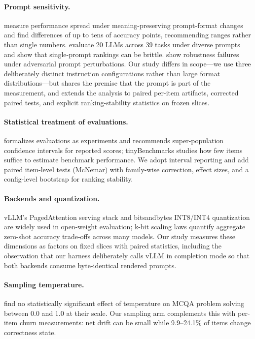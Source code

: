\paragraph{Prompt sensitivity.}
\citet{sclar2024quantifying} measure performance spread under
meaning-preserving prompt-format changes and find differences of up to tens
of accuracy points, recommending ranges rather than single numbers.
\citet{mizrahi2024state} evaluate 20 LLMs across 39 tasks under diverse
prompts and show that single-prompt rankings can be brittle.
\citet{zhu2024promptrobust} show robustness failures under adversarial
prompt perturbations. Our study differs in scope---we use three deliberately
distinct instruction configurations rather than large format
distributions---but shares the premise that the prompt is part of the
measurement, and extends the analysis to paired per-item artifacts,
corrected paired tests, and explicit ranking-stability statistics on frozen
slices.

\paragraph{Statistical treatment of evaluations.}
\citet{miller2024adding} formalizes evaluations as experiments and
recommends super-population confidence intervals for reported scores;
tinyBenchmarks \citep{polo2024tinybenchmarks} studies how few items suffice
to estimate benchmark performance. We adopt interval reporting and add
paired item-level tests (McNemar) with family-wise correction, effect
sizes, and a config-level bootstrap for ranking stability.

\paragraph{Backends and quantization.}
vLLM's PagedAttention serving stack \citep{kwon2023efficient} and
bitsandbytes INT8/INT4 quantization \citep{dettmers2022llm,dettmers2023case}
are widely used in open-weight evaluation; k-bit scaling laws quantify
aggregate zero-shot accuracy trade-offs across many models. Our study
measures these dimensions as factors on fixed slices with paired statistics,
including the observation that our harness deliberately calls vLLM in
completion mode so that both backends consume byte-identical rendered
prompts.

\paragraph{Sampling temperature.}
\citet{renze2024temperature} find no statistically significant effect of
temperature on MCQA problem solving between 0.0 and 1.0 at their scale. Our
sampling arm complements this with per-item churn measurements: net drift
can be small while 9.9--24.1\% of items change correctness state.



